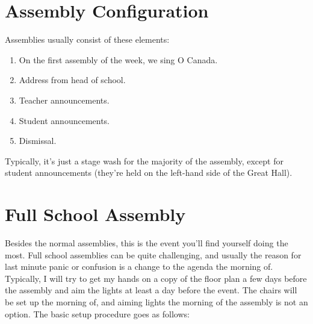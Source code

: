 \documentclass[letterpaper,10pt,oneside,headsepline]{scrreprt}
\begin{document}
\section{Assembly Configuration}
Assemblies usually consist of these elements:
\begin{enumerate}
\item On the first assembly of the week, we sing O Canada.
\item Address from head of school.
\item Teacher announcements.
\item Student announcements. 
\item Dismissal.
\end{enumerate} 
Typically, it's just a stage wash for the majority of the assembly, except for student announcements (they're held on the left-hand side of the Great Hall).

\section{Full School Assembly}
Besides the normal assemblies, this is the event you'll find yourself doing the most. Full school assemblies can be quite challenging, and usually the reason for last minute panic or confusion is a change to the agenda the morning of. Typically, I will try to get my hands on a copy of the floor plan a few days before the assembly and aim the lights at least a day before the event. The chairs will be set up the morning of, and aiming lights the morning of the assembly is not an option. The basic setup procedure goes as follows:
\end{document}

